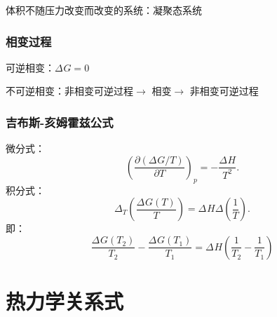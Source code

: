 \begin{notation}
    体积不随压力改变而改变的系统：凝聚态系统
\end{notation}
\subsubsection*{相变过程}%
\label{subsub*:相变过程}
可逆相变：$\Delta_\text{}G = 0 $ 

不可逆相变：非相变可逆过程$\to $ 相变$\to $ 非相变可逆过程
\subsubsection*{吉布斯-亥姆霍兹公式}%
\label{subsub*:吉布斯-亥姆霍兹公式}
微分式：
\[
    \left(\frac{\partial \left( \Delta_\text{}G / T  \right)}{\partial T}\right)_{p} = -\frac{\Delta_\text{}H }{T^2 }
.\]
积分式：
\[
    \Delta_{T} \left( \frac{\Delta_\text{}G\left( T \right) }{T} \right) = \Delta_\text{}H \Delta\left( \frac{1}{T} \right)
.\]
即：
\begin{equation}
    \label{eq:gdt=hd1/t}\boxed{
    \frac{\Delta_\text{}G\left( T_2 \right) }{T_2} - \frac{\Delta_\text{}G \left( T_1 \right) }{T_1} = \Delta_\text{}H \left( \frac{1}{T_2} - \frac{1}{T_1} \right) 
}
\end{equation}
\section{热力学关系式}%
\label{sec:热力学关系式}
